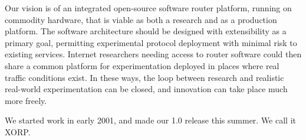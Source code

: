 Our vision is of an integrated open-source software router platform,
running on commodity hardware, that is viable as both a research and as a
production platform.  The software architecture should be designed
with extensibility as a primary goal, permitting experimental
protocol deployment with minimal risk to existing services.  Internet researchers needing access to router software could
then share a common platform for experimentation deployed in places
where real traffic conditions exist.  In these ways, the loop
between research and realistic real-world experimentation can be
closed, and innovation can take place much more freely.

We started work in early 2001, and made our 1.0 release this summer.
We call it XORP.



